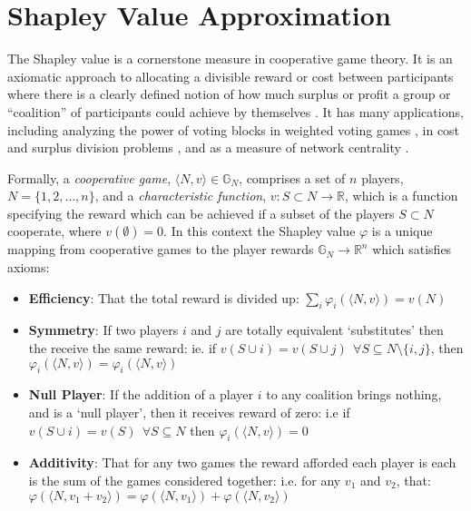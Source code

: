 
\pagebreak
\section{Shapley Value Approximation}\label{sec:shapley}

The Shapley value is a cornerstone measure in cooperative game theory. 
It is an axiomatic approach to allocating a divisible reward or cost between participants where there is a clearly defined notion of how much surplus or profit a group or ``coalition'' of participants could achieve by themselves \citep{ChalkiadakisEtAl2012}.
It has many applications, 
including analyzing the power of voting blocks in weighted voting games \citep{Bachrach2009ApproximatingPI}, 
in cost and surplus division problems  \citep{AzizEtal2016,archie_paper1}, 
and as a measure of network centrality \citep{Michalak:2013}.

Formally, a \textit{cooperative game}, $\langle N,v\rangle\in\mathbb{G}_N$, comprises a set of $n$ players, $N=\{1,2,\dots,n\}$, and a \textit{characteristic function}, $v:S\subset N\rightarrow \mathbb{R}$, which is a function specifying the reward which can be achieved if a subset of the players $S\subset N$ cooperate, where $v(\emptyset)=0$.
In this context the Shapley value $\varphi$ is a unique mapping from cooperative games to the player rewards $\mathbb{G}_N\rightarrow\mathbb{R}^n$ which satisfies axioms:

\begin{itemize}
\item	
\textbf{Efficiency}: That the total reward is divided up: $\sum_i\varphi_i(\langle N,v\rangle) = v(N)$
\item	
\textbf{Symmetry}: If two players $i$ and $j$ are totally equivalent `substitutes' then the receive the same reward: ie. if $v(S\cup i)=v(S\cup j)~~\forall S\subseteq N\setminus\{i,j\}$, then $\varphi_i(\langle N,v\rangle) = \varphi_i(\langle N,v\rangle)$
\item	
\textbf{Null Player}: If the addition of a player $i$ to any coalition brings nothing, and is a `null player', then it receives reward of zero: i.e if $v(S\cup i)=v(S)~~\forall S\subseteq N$ then $\varphi_i(\langle N,v\rangle)=0$
\item	
\textbf{Additivity}: That for any two games the reward afforded each player is each is the sum of the games considered together: i.e. for any $v_1$ and $v_2$, that: $\varphi(\langle N,v_1+v_2\rangle)=\varphi(\langle N,v_1 \rangle) + \varphi(\langle N,v_2\rangle)$
\end{itemize}

